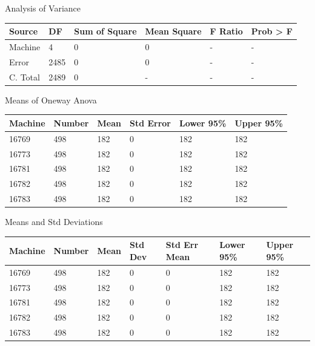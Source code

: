 \documentclass[12pt]{report}
\begin{document}
Analysis of Variance
\newline
\begin{tabular}{l | l | l | l | l | l}
Source&DF&Sum of Square&Mean Square&F Ratio&Prob > F \\
\hline
Machine&4&0&0&-&- \\
Error&2485&0&0&-&- \\
C. Total&2489&0&-&-&- \\
\end{tabular}
\newline

Means of Oneway Anova
\newline
\begin{tabular}{l | l | l | l | l | l}
Machine&Number&Mean&Std Error&Lower 95\%&Upper 95\% \\
\hline
16769&498&182&0&182&182 \\
16773&498&182&0&182&182 \\
16781&498&182&0&182&182 \\
16782&498&182&0&182&182 \\
16783&498&182&0&182&182 \\
\end{tabular}
\newline

Means and Std Deviations
\newline
\begin{tabular}{l | l | l | l | l | l | l}
Machine&Number&Mean&Std Dev&Std Err Mean&Lower 95\%&Upper 95\% \\
\hline
16769&498&182&0&0&182&182 \\
16773&498&182&0&0&182&182 \\
16781&498&182&0&0&182&182 \\
16782&498&182&0&0&182&182 \\
16783&498&182&0&0&182&182 \\
\end{tabular}
\newline
\end{document}
